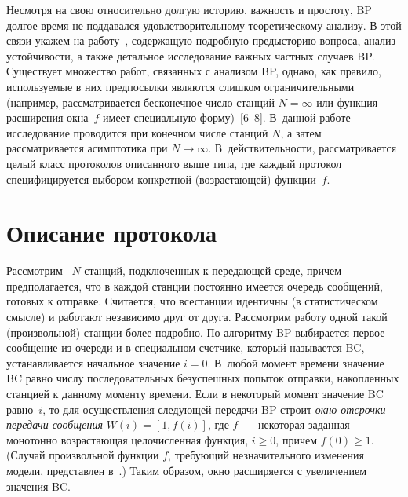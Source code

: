 \begin{multicols}{2}
Несмотря на свою относительно  долгую историю, важность  и простоту,
BP долгое время не поддавался удовлетворительному теоретическому
анализу. В этой связи укажем на  работу~\cite {HASTAD}, содержащую
подробную предысторию вопроса, анализ
устойчивости, а также детальное исследование важных
частных случаев BP. Существует множество работ, связанных с анализом
BP, однако, как правило, используемые в них предпосылки являются
слишком ограничительными (например, рассматривается  бесконечное
число станций $N=\infty$ или функция расширения окна~$f$ имеет
специальную форму)~[6--8].  В~данной работе
исследование проводится при  конечном числе станций $N$, а затем
рассматривается асимптотика при  $N\to \infty$. В~действительности,
 рассматривается  целый класс протоколов описанного
выше типа, где каждый протокол специфицируется выбором конкретной
(возрастающей) функции~$f$.

\section{Описание протокола}

Рассмотрим~ $N$ станций, подключенных к передающей среде, причем
предполагается, что в каж\-дой станции постоянно имеется очередь
сообщений, готовых к отправке. Считается, что все\linebreak станции идентичны
(в статистическом смысле) и работают независимо друг от друга.
Рассмотрим работу одной такой (произвольной) станции более подробно.
По алгоритму BP выбирается первое сообщение из очереди и в
специальном счетчике, который  называется  BC, устанавливается
начальное значение $i=0$. В~любой момент времени значение BC равно
числу   последовательных  безуспешных попыток отправки, накопленных
станцией к данному моменту времени.
Если в некоторый момент значение BC равно~$i$, то  для
осуществления следующей передачи BP строит   {\it окно отсрочки
передачи сообщения} $W(i)= [1,f(i)]$,
 где $f$~--- некоторая  заданная монотонно возрастающая целочисленная
 функция, $i\ge 0$, причем  $f(0)\ge 1$.
  (Случай произвольной функции  $f$, требующий  незначительного изменения
  модели,  представлен в~\cite{LUKYA}.) Таким образом,  окно
  расширяется  с увеличением   значения BC.


\end{multicols}
